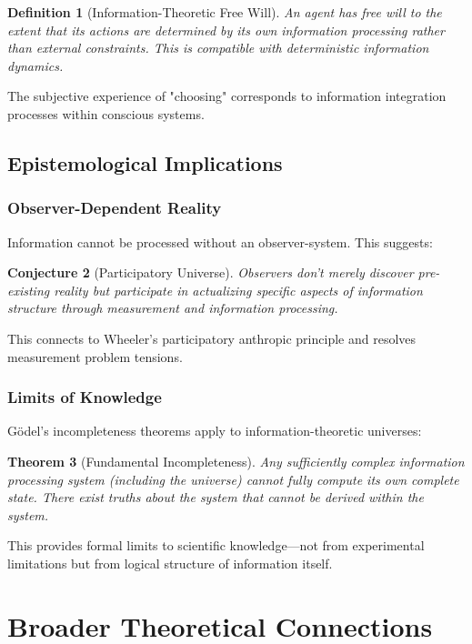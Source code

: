 \documentclass[12pt,a4paper]{article}
\newtheorem{theorem}{Theorem}[section]
\newtheorem{definition}[theorem]{Definition}
\newtheorem{conjecture}[theorem]{Conjecture}
\theoremstyle{remark}
\begin{document}
\begin{definition}[Information-Theoretic Free Will]
An agent has free will to the extent that its actions are determined by its own information processing rather than external constraints. This is compatible with deterministic information dynamics.
\end{definition}

The subjective experience of "choosing" corresponds to information integration processes within conscious systems.

\subsection{Epistemological Implications}

\subsubsection{Observer-Dependent Reality}

Information cannot be processed without an observer-system. This suggests:

\begin{conjecture}[Participatory Universe]
Observers don't merely discover pre-existing reality but participate in actualizing specific aspects of information structure through measurement and information processing.
\end{conjecture}

This connects to Wheeler's participatory anthropic principle and resolves measurement problem tensions.

\subsubsection{Limits of Knowledge}

Gödel's incompleteness theorems apply to information-theoretic universes:

\begin{theorem}[Fundamental Incompleteness]
Any sufficiently complex information processing system (including the universe) cannot fully compute its own complete state. There exist truths about the system that cannot be derived within the system.
\end{theorem}

This provides formal limits to scientific knowledge—not from experimental limitations but from logical structure of information itself.

\section{Broader Theoretical Connections}
\end{document}
